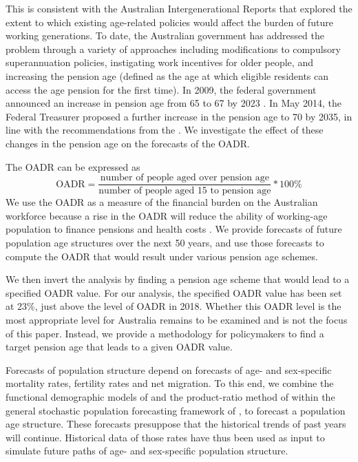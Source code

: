 \documentclass[
  doublespace]{anzsauth}
\begin{document}
This is consistent with the Australian Intergenerational Reports \citep{IGR02, IGR07, Swan2010} that explored the extent to which existing age-related policies would affect the burden of future working generations. To date, the Australian government has addressed the problem through a variety of approaches including modifications to compulsory superannuation policies, instigating work incentives for older people, and increasing the pension age (defined as the age at which eligible residents can access the age pension for the first time). In 2009, the federal government announced an increase in pension age from 65 to 67 by 2023 \citep{Nielson2010}. In May 2014, the Federal Treasurer proposed a further increase in the pension age to 70 by 2035, in line with the recommendations from the \citet{PC13}. We investigate the effect of these changes in the pension age on the forecasts of the OADR.

The OADR can be expressed as
\begin{equation}
  \text{OADR} = \frac{\text{number of people aged over pension age}}{\text{number of people aged 15 to pension age}}*100\%
\end{equation}
We use the OADR as a measure of the financial burden on the Australian workforce because a rise in the OADR will reduce the ability of working-age population to finance pensions and health costs \citep{ARW07, IGR02, IGR07}.
We provide forecasts of future population age structures over the next 50 years, and use those forecasts to compute the OADR that would result under various pension age schemes.

We then invert the analysis by finding a pension age scheme that would lead to a specified OADR value. For our analysis, the specified OADR value has been set at 23\%, just above the level of OADR in 2018. Whether this OADR level is the most appropriate level for Australia remains to be examined and is not the focus of this paper. Instead, we provide a methodology for policymakers to find a target pension age that leads to a given OADR value.

Forecasts of population structure depend on forecasts of age- and sex-specific mortality rates, fertility rates and net migration. To this end, we combine the functional demographic models of \citet{HU07} and the product-ratio method of \citet{HBY13} within the general stochastic population forecasting framework of \citet{HB08}, to forecast a population age structure. These forecasts presuppose that the historical trends of past years will continue. Historical data of those rates have thus been used as input to simulate future paths of age- and sex-specific population structure.
\end{document}
